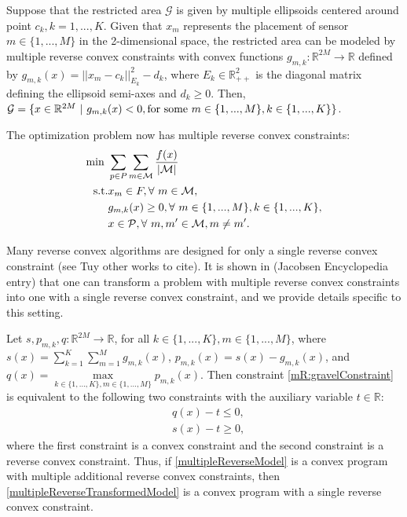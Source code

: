 Suppose that the restricted area $\mathcal{G}$ is given by multiple ellipsoids centered around point $c_{k}, k = 1,...,K$. Given that $x_{m}$ represents the placement of sensor $m \in \{1,...,M\}$ in the 2-dimensional space, the restricted area can be modeled by multiple reverse convex constraints with convex functions $g_{m,k}: \mathbb{R}^{2M} \to \mathbb{R}$ defined by $g_{m,k}(x) = ||x_{m} - c_{k}||^{2}_{E_{k}} - d_{k}$, where $E_{k} \in \mathbb{R}^{2}_{++}$ is the diagonal matrix defining the ellipsoid semi-axes and $d_{k} \geq 0$. 
Then, $\mathcal{G} = \{x \in \mathbb{R}^{2M} \text{ }|\text{ } g_{m,k}(x) < 0, \text{for some } m \in \{1,...,M\}, k \in \{1,...,K\}\}$.

The optimization problem now has multiple reverse convex constraints:
\begin{subequations}\label{multipleReverseModel}
\begin{align}                                               
\min \ &\sum\limits_{p \in P}\sum\limits_{m \in \cM} \frac{f(x)}{|\cM|} \\
\text{s.t.} & x_{m} \in F, \forall \ m \in \cM, \label{mR:gravelConstraint}\\
& g_{m,k}(x) \geq 0, \forall \ m \in \{1,...,M\}, k \in \{1,...,K\}, \\
&x \in \cP, \forall \ m, m' \in \cM, m \neq m'. \label{mR:radiusConstraint}
\end{align}
\end{subequations}

Many reverse convex algorithms are designed for only a single reverse convex constraint (see Tuy other works to cite). It is shown in (Jacobsen Encyclopedia entry) that one can transform a problem with multiple reverse convex constraints into one with a single reverse convex constraint, and we provide details specific to this setting.

Let $s, p_{m,k}, q: \mathbb{R}^{2M} \to \mathbb{R}$, for all $k \in \{1,...,K\}, m \in \{1,...,M\}$, where $s(x) = \sum\limits_{k = 1}^{K}\sum\limits_{m = 1}^{M} g_{m,k}(x)$, $p_{m,k}(x) = s(x) - g_{m,k}(x)$, and $q(x) = \max\limits_{k \in \{1,...,K\}, m \in \{1,...,M\}} p_{m,k}(x)$. Then constraint \eqref{mR:gravelConstraint} is equivalent to the following two constraints with the auxiliary variable $t \in \mathbb{R}$:
\begin{align*}
& q(x) - t \leq 0,\\
& s(x) - t \geq 0,
\end{align*}
where the first constraint is a convex constraint and the second constraint is a reverse convex constraint. Thus, if \eqref{multipleReverseModel} is a convex program with multiple additional reverse convex constraints, then \eqref{multipleReverseTransformedModel} is a convex program with a single reverse convex constraint.

